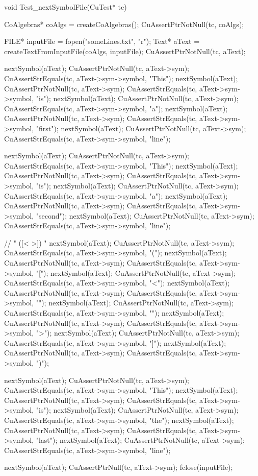 void Test_nextSymbolFile(CuTest* tc) {
  CoAlgebras* coAlgs = createCoAlgebras();
  CuAssertPtrNotNull(tc, coAlgs);

  FILE* inputFile = fopen("someLines.txt", "r");
  Text* aText = createTextFromInputFile(coAlgs, inputFile);
  CuAssertPtrNotNull(tc, aText);

  nextSymbol(aText);
  CuAssertPtrNotNull(tc, aText->sym);
  CuAssertStrEquals(tc, aText->sym->symbol, "This");
  nextSymbol(aText);
  CuAssertPtrNotNull(tc, aText->sym);
  CuAssertStrEquals(tc, aText->sym->symbol, "is");
  nextSymbol(aText);
  CuAssertPtrNotNull(tc, aText->sym);
  CuAssertStrEquals(tc, aText->sym->symbol, "a");
  nextSymbol(aText);
  CuAssertPtrNotNull(tc, aText->sym);
  CuAssertStrEquals(tc, aText->sym->symbol, "first");
  nextSymbol(aText);
  CuAssertPtrNotNull(tc, aText->sym);
  CuAssertStrEquals(tc, aText->sym->symbol, "line");

  nextSymbol(aText);
  CuAssertPtrNotNull(tc, aText->sym);
  CuAssertStrEquals(tc, aText->sym->symbol, "This");
  nextSymbol(aText);
  CuAssertPtrNotNull(tc, aText->sym);
  CuAssertStrEquals(tc, aText->sym->symbol, "is");
  nextSymbol(aText);
  CuAssertPtrNotNull(tc, aText->sym);
  CuAssertStrEquals(tc, aText->sym->symbol, "a");
  nextSymbol(aText);
  CuAssertPtrNotNull(tc, aText->sym);
  CuAssertStrEquals(tc, aText->sym->symbol, "second");
  nextSymbol(aText);
  CuAssertPtrNotNull(tc, aText->sym);
  CuAssertStrEquals(tc, aText->sym->symbol, "line");

  // " ([<{ }>]) "
  nextSymbol(aText);
  CuAssertPtrNotNull(tc, aText->sym);
  CuAssertStrEquals(tc, aText->sym->symbol, "(");
  nextSymbol(aText);
  CuAssertPtrNotNull(tc, aText->sym);
  CuAssertStrEquals(tc, aText->sym->symbol, "[");
  nextSymbol(aText);
  CuAssertPtrNotNull(tc, aText->sym);
  CuAssertStrEquals(tc, aText->sym->symbol, "<");
  nextSymbol(aText);
  CuAssertPtrNotNull(tc, aText->sym);
  CuAssertStrEquals(tc, aText->sym->symbol, "{");
  nextSymbol(aText);
  CuAssertPtrNotNull(tc, aText->sym);
  CuAssertStrEquals(tc, aText->sym->symbol, "}");
  nextSymbol(aText);
  CuAssertPtrNotNull(tc, aText->sym);
  CuAssertStrEquals(tc, aText->sym->symbol, ">");
  nextSymbol(aText);
  CuAssertPtrNotNull(tc, aText->sym);
  CuAssertStrEquals(tc, aText->sym->symbol, "]");
  nextSymbol(aText);
  CuAssertPtrNotNull(tc, aText->sym);
  CuAssertStrEquals(tc, aText->sym->symbol, ")");

  nextSymbol(aText);
  CuAssertPtrNotNull(tc, aText->sym);
  CuAssertStrEquals(tc, aText->sym->symbol, "This");
  nextSymbol(aText);
  CuAssertPtrNotNull(tc, aText->sym);
  CuAssertStrEquals(tc, aText->sym->symbol, "is");
  nextSymbol(aText);
  CuAssertPtrNotNull(tc, aText->sym);
  CuAssertStrEquals(tc, aText->sym->symbol, "the");
  nextSymbol(aText);
  CuAssertPtrNotNull(tc, aText->sym);
  CuAssertStrEquals(tc, aText->sym->symbol, "last");
  nextSymbol(aText);
  CuAssertPtrNotNull(tc, aText->sym);
  CuAssertStrEquals(tc, aText->sym->symbol, "line");

  nextSymbol(aText);
  CuAssertPtrNull(tc, aText->sym);
  fclose(inputFile);
}

